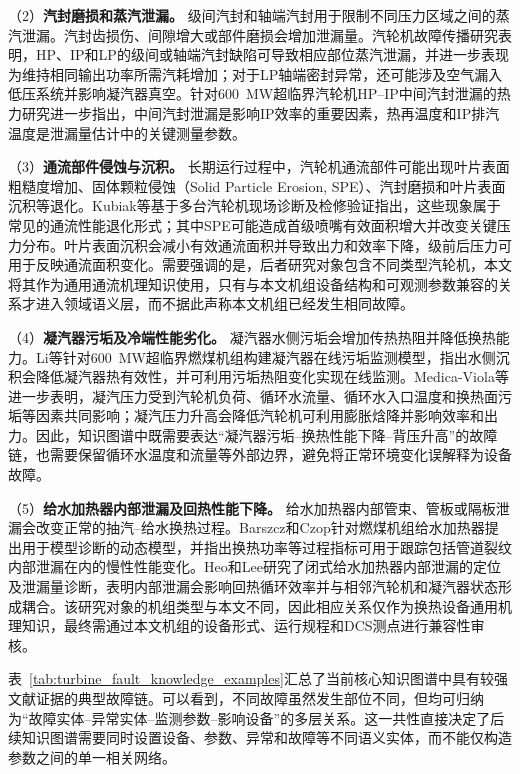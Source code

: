 （2）\textbf{汽封磨损和蒸汽泄漏。} 级间汽封和轴端汽封用于限制不同压力区域之间的蒸汽泄漏。汽封齿损伤、间隙增大或部件磨损会增加泄漏量。汽轮机故障传播研究表明，HP、IP和LP的级间或轴端汽封缺陷可导致相应部位蒸汽泄漏，并进一步表现为维持相同输出功率所需汽耗增加；对于LP轴端密封异常，还可能涉及空气漏入低压系统并影响凝汽器真空\cite{ZhangHu2021FaultPropagationGNN}。针对600~MW超临界汽轮机HP--IP中间汽封泄漏的热力研究进一步指出，中间汽封泄漏是影响IP效率的重要因素，热再温度和IP排汽温度是泄漏量估计中的关键测量参数\cite{Xu2011HPIPLeakage}。

（3）\textbf{通流部件侵蚀与沉积。} 长期运行过程中，汽轮机通流部件可能出现叶片表面粗糙度增加、固体颗粒侵蚀（Solid Particle Erosion, SPE）、汽封磨损和叶片表面沉积等退化。Kubiak等基于多台汽轮机现场诊断及检修验证指出，这些现象属于常见的通流性能退化形式；其中SPE可能造成首级喷嘴有效面积增大并改变关键压力分布\cite{Kubiak2002TurbineDegradation}。叶片表面沉积会减小有效通流面积并导致出力和效率下降，级前后压力可用于反映通流面积变化\cite{Kubiak2002ScaleDeposit}。需要强调的是，后者研究对象包含不同类型汽轮机，本文将其作为通用通流机理知识使用，只有与本文机组设备结构和可观测参数兼容的关系才进入领域语义层，而不据此声称本文机组已经发生相同故障。

（4）\textbf{凝汽器污垢及冷端性能劣化。} 凝汽器水侧污垢会增加传热热阻并降低换热能力。Li等针对600~MW超临界燃煤机组构建凝汽器在线污垢监测模型，指出水侧沉积会降低凝汽器热有效性，并可利用污垢热阻变化实现在线监测\cite{Li2016CondenserFouling}。Medica-Viola等进一步表明，凝汽压力受到汽轮机负荷、循环水流量、循环水入口温度和换热面污垢等因素共同影响；凝汽压力升高会降低汽轮机可利用膨胀焓降并影响效率和出力\cite{Medica2018CondenserCondition}。因此，知识图谱中既需要表达“凝汽器污垢--换热性能下降--背压升高”的故障链，也需要保留循环水温度和流量等外部边界，避免将正常环境变化误解释为设备故障。

（5）\textbf{给水加热器内部泄漏及回热性能下降。} 给水加热器内部管束、管板或隔板泄漏会改变正常的抽汽--给水换热过程。Barszcz和Czop针对燃煤机组给水加热器提出用于模型诊断的动态模型，并指出换热功率等过程指标可用于跟踪包括管道裂纹内部泄漏在内的慢性性能变化\cite{Barszcz2011FeedwaterHeater}。Heo和Lee研究了闭式给水加热器内部泄漏的定位及泄漏量诊断，表明内部泄漏会影响回热循环效率并与相邻汽轮机和凝汽器状态形成耦合\cite{Heo2012FWHLeakage}。该研究对象的机组类型与本文不同，因此相应关系仅作为换热设备通用机理知识，最终需通过本文机组的设备形式、运行规程和DCS测点进行兼容性审核。

表~\ref{tab:turbine_fault_knowledge_examples}汇总了当前核心知识图谱中具有较强文献证据的典型故障链。可以看到，不同故障虽然发生部位不同，但均可归纳为“故障实体--异常实体--监测参数--影响设备”的多层关系。这一共性直接决定了后续知识图谱需要同时设置设备、参数、异常和故障等不同语义实体，而不能仅构造参数之间的单一相关网络。

